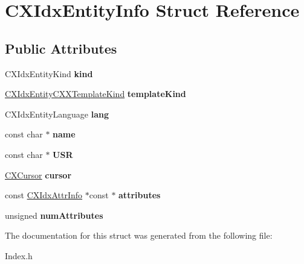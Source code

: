 \hypertarget{structCXIdxEntityInfo}{}\section{C\+X\+Idx\+Entity\+Info Struct Reference}
\label{structCXIdxEntityInfo}
\subsection*{Public Attributes}
\begin{DoxyCompactItemize}
\item 
\mbox{\label{structCXIdxEntityInfo_a7e62dd3be28609af350dbc0f530e5a97}} 
C\+X\+Idx\+Entity\+Kind {\bfseries kind}
\item 
\mbox{\label{structCXIdxEntityInfo_aca7b25befc44d53c38630136eb86a2a7}} 
\mbox{\hyperlink{group__CINDEX__HIGH_gaffb304a99b36f147738b3349e7aa22cb}{C\+X\+Idx\+Entity\+C\+X\+X\+Template\+Kind}} {\bfseries template\+Kind}
\item 
\mbox{\label{structCXIdxEntityInfo_adfa8414550b76d6f0a3b14ec03121022}} 
C\+X\+Idx\+Entity\+Language {\bfseries lang}
\item 
\mbox{\label{structCXIdxEntityInfo_a72dc7b0750367104a1a98433c31be92d}} 
const char $\ast$ {\bfseries name}
\item 
\mbox{\label{structCXIdxEntityInfo_a4c5d686849d9ba9f8020bc0b9a65416f}} 
const char $\ast$ {\bfseries U\+SR}
\item 
\mbox{\label{structCXIdxEntityInfo_ab9951c6678c5efac6577a0eb851ad4b5}} 
\mbox{\hyperlink{structCXCursor}{C\+X\+Cursor}} {\bfseries cursor}
\item 
\mbox{\label{structCXIdxEntityInfo_af0634388d35f36aab8ef6f8187c56860}} 
const \mbox{\hyperlink{structCXIdxAttrInfo}{C\+X\+Idx\+Attr\+Info}} $\ast$const  $\ast$ {\bfseries attributes}
\item 
\mbox{\label{structCXIdxEntityInfo_aee5ba7574362fce864d73840451e4f75}} 
unsigned {\bfseries num\+Attributes}
\end{DoxyCompactItemize}


The documentation for this struct was generated from the following file\+:\begin{DoxyCompactItemize}
\item 
Index.\+h\end{DoxyCompactItemize}
